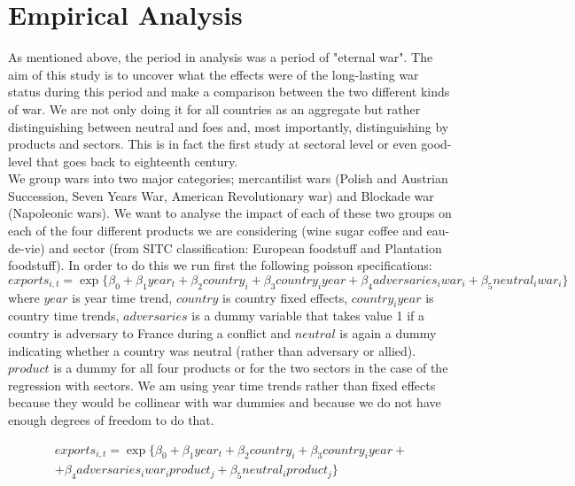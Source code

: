 \documentclass[12pt,a4paper,titlepage,english]{article}
\begin{document}
\section{Empirical Analysis}
As mentioned above, the period in analysis was a period of "eternal war". The aim of this study is to uncover what the effects were of the long-lasting war status during this period and make a comparison between the two different kinds of war. We are not only doing it for all countries as an aggregate but rather distinguishing between neutral and foes and, most importantly, distinguishing by products and sectors. This is in fact the first study at sectoral level or even good-level that goes back to eighteenth century. \\
We group wars into two major categories; mercantilist wars (Polish and Austrian Succession, Seven Years War, American Revolutionary war) and Blockade war (Napoleonic wars). We want to analyse the impact of each of these two groups on each of the four different products we are considering (wine sugar coffee and eau-de-vie) and sector (from SITC classification: European foodstuff and Plantation foodstuff). In order to do this we run first the following poisson specifications:
\begin{equation}
exports_{i,t}=\exp\{\beta_0+\beta_1year_t + \beta_2country_i+\beta_3country_iyear+\beta_4adversaries_iwar_i+\beta_5neutral_iwar_i\}
\end{equation}
where $year$ is year time trend, $country$ is country fixed effects, $country_iyear$ is country time trends, $adversaries$ is a dummy variable that takes value 1 if a country is adversary to France during a conflict and $neutral$ is again a dummy indicating whether a country was neutral (rather than adversary or allied). $product$  is a dummy for all four products or for the two sectors in the case of the regression with sectors. We am using year time trends rather than fixed effects because they would be collinear with war dummies and because we do not have enough degrees of freedom to do that. 



\begin{multline}
exports_{i,t}=\exp\{\beta_0+\beta_1year_t + \beta_2country_i+\beta_3country_iyear+ \\ +\beta_4adversaries_iwar_iproduct_j+\beta_5neutral_iproduct_j\}
\end{multline}
\end{document}
